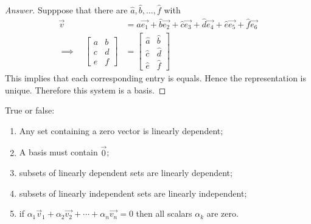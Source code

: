 \begin{proof}[Answer]
  Supppose that there are $\hat{a},\hat{b},\dots,\hat{f}$ with
  \begin{align*}
    \vec{v}&=\hat{a}\vec{e_1}+\hat{b}\vec{e_2}+\hat{c}\vec{e_3}
              +\hat{d}\vec{e_4}+\hat{e}\vec{e_5}+\hat{f}\vec{e_6}\\
    \implies\quad 
    \begin{bmatrix} 
      a&b\\c&d\\e&f 
    \end{bmatrix}
    &=
    \begin{bmatrix} 
      \hat{a} & \hat{b}\\ \hat{c}&\hat{d} \\ \hat{e}&\hat{f}
    \end{bmatrix}
  \end{align*}
  This implies that each corresponding entry is equals. Hence the representation
  is unique. Therefore this system is a basis.




\end{proof}
\begin{exercise}
  True or false:
  \begin{enumerate}
    \item Any set containing a zero vector is linearly dependent;
    \item A basis must contain $\vec{0}$;
    \item subsets of linearly dependent sets are linearly dependent;
    \item subsets of linearly independent sets are linearly independent;
    \item if $\alpha_1\vec{v}_1+\alpha_2\vec{v_2}+\cdots+\alpha_n\vec{v_n}=0$
      then all scalars $\alpha_k$ are zero.
  \end{enumerate}
\end{exercise}
